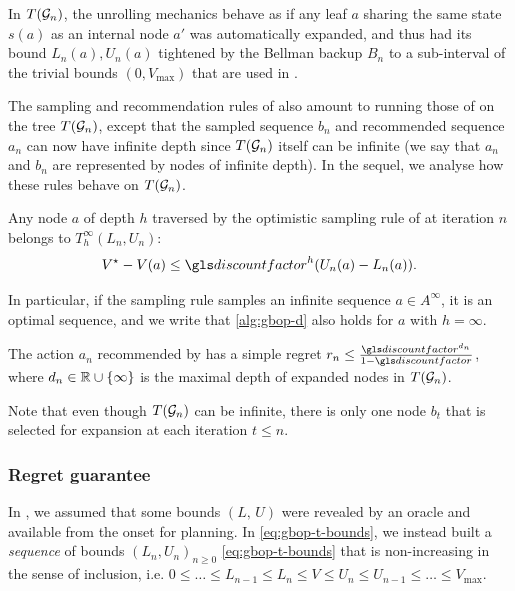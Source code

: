In $T(\mathcal{G}_n)$, the unrolling mechanics behave as if any leaf $a$ sharing the same state $s(a)$ as an internal node $a'$ was automatically expanded, and thus had its bound $L_n(a), U_n(a)$ tightened by the Bellman backup $B_n$ to a sub-interval of the trivial bounds $(0, V_{\max})$ that are used in \OPD.

The sampling and recommendation rules of \GBOPD also amount to running those of \OPD on the tree $T(\mathcal{G}_n)$, except that the sampled sequence $b_n$ and recommended sequence $a_n$ can now have infinite depth since $T(\mathcal{G}_n)$ itself can be infinite (we say that $a_n$ and $b_n$ are represented by nodes of infinite depth). In the sequel, we analyse how these rules behave on $T(\mathcal{G}_n)$.

\begin{lemma}[Expansion]
	\begin{leftbar}[lemmabar]
	\label{lem:expansion-bound}
	Any node $a$ of depth $h$ traversed by the optimistic sampling rule of \GBOPD at iteration $n$ belongs to $T_h^\infty(L_n, U_n)$: 
	\begin{equation}
	\label{eq:expansion-regret}
	V^\star-V(a) \leq \discount^h(U_n(a)-L_n(a)).
	\end{equation}
	
	In particular, if the sampling rule samples an infinite sequence $a\in A^\infty$, it is an optimal sequence, and we write that \eqref{alg:gbop-d} also holds for $a$ with $h=\infty$.
	\end{leftbar}
\end{lemma}


\begin{lemma}[Recommendation]
	\begin{leftbar}[lemmabar]
	\label{lem:recommendation-bound}
	The action $a_n$ recommended by \GBOPD has a simple regret $r_n \leq \frac{\discount^{d_n}}{1-\discount}$, where $d_n\in\mathbb{R}\cup\{\infty\}$ is the maximal depth of expanded nodes in $T(\mathcal{G}_n)$.
	\end{leftbar}
\end{lemma}
Note that even though $T(\mathcal{G}_n)$ can be infinite, there is only one node $b_t$ that is selected for expansion at each iteration $t\leq n$.

\subsubsection{Regret guarantee}

In , we assumed that some bounds $(L,\,U)$ were revealed by an oracle and available from the onset for planning. In \eqref{eq:gbop-t-bounds}, we instead built a \emph{sequence} of bounds $(L_n,U_n)_{n\geq 0}$ \eqref{eq:gbop-t-bounds} that is non-increasing in the sense of inclusion, i.e. $0\leq \dots\leq L_{n-1}\leq L_n\leq V\leq U_n\leq U_{n-1}\leq \dots\leq V_{\max}$.

